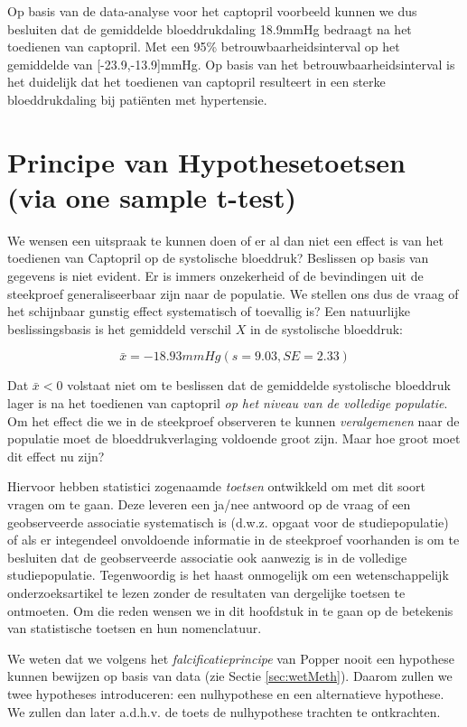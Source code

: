 \documentclass[
  12pt,dutch]{book}
\theoremstyle{definition}
\theoremstyle{definition}
\theoremstyle{definition}
\theoremstyle{definition}
\theoremstyle{remark}
\begin{document}
Op basis van de data-analyse voor het captopril voorbeeld kunnen we dus besluiten dat de gemiddelde bloeddrukdaling
18.9mmHg bedraagt na het toedienen van captopril. Met een 95\% betrouwbaarheidsinterval op het gemiddelde van {[}-23.9,-13.9{]}mmHg.
Op basis van het betrouwbaarheidsinterval is het duidelijk dat het toedienen van captopril resulteert in een sterke bloeddrukdaling bij patiënten met hypertensie.

\section{Principe van Hypothesetoetsen (via one sample t-test)}\label{principe-van-hypothesetoetsen-via-one-sample-t-test}

We wensen een uitspraak te kunnen doen of er al dan niet een effect is van het toedienen van Captopril op de systolische bloeddruk? Beslissen op basis van gegevens is niet evident. Er is immers onzekerheid of de bevindingen uit de steekproef
generaliseerbaar zijn naar de populatie. We stellen ons dus de vraag of het schijnbaar gunstig effect systematisch of toevallig is?
Een natuurlijke beslissingsbasis is het gemiddeld verschil \(X\) in de systolische bloeddruk:

\[\bar x=-18.93mmHg (s = 9.03, SE = 2.33)\]

Dat \(\bar{x}< 0\) volstaat niet om te beslissen dat de gemiddelde systolische bloeddruk lager is na het toedienen van captopril \emph{op het niveau van de volledige populatie}. Om het effect die we in de steekproef observeren te kunnen \emph{veralgemenen} naar de populatie moet de bloeddrukverlaging voldoende groot zijn. Maar hoe groot moet dit effect nu zijn?

Hiervoor hebben statistici zogenaamde \emph{toetsen} ontwikkeld om met dit soort vragen om te gaan. Deze leveren een ja/nee antwoord op de vraag of een geobserveerde associatie systematisch is (d.w.z. opgaat voor de studiepopulatie) of als er integendeel onvoldoende informatie in de steekproef voorhanden is om te besluiten dat de geobserveerde associatie ook aanwezig is in de volledige studiepopulatie. Tegenwoordig is het
haast onmogelijk om een wetenschappelijk onderzoeksartikel te lezen zonder
de resultaten van dergelijke toetsen te ontmoeten. Om die reden wensen we in
dit hoofdstuk in te gaan op de betekenis van statistische toetsen en hun
nomenclatuur.

We weten dat we volgens het \emph{falcificatieprincipe} van Popper nooit een hypothese kunnen bewijzen op basis van data (zie Sectie \ref{sec:wetMeth}).
Daarom zullen we twee hypotheses introduceren: een nulhypothese en een alternatieve hypothese.
We zullen dan later a.d.h.v. de toets de nulhypothese trachten te ontkrachten.
\end{document}
